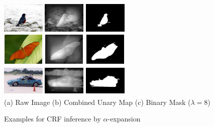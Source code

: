 \documentclass[10pt,twocolumn,letterpaper]{article}
\begin{document}
\begin{figure}[h]
\begin{center}
    \includegraphics[width=0.8in,height=0.6in]{./Figures/CRFinference/5_159_159364.jpg}
    \includegraphics[width=0.8in,height=0.6in]{./Figures/CRFinference/5_159_159364_3.jpg}
    \includegraphics[width=0.8in,height=0.6in]{./Figures/CRFinference/5_159_159364_2.jpg} \\
    \includegraphics[width=0.8in,height=0.6in]{./Figures/CRFinference/5_159_159649.jpg}
    \includegraphics[width=0.8in,height=0.6in]{./Figures/CRFinference/5_159_159649_3.jpg}
    \includegraphics[width=0.8in,height=0.6in]{./Figures/CRFinference/5_159_159649_2.jpg} \\
    \includegraphics[width=0.8in,height=0.6in]{./Figures/CRFinference/5_162_162349.jpg}
    \includegraphics[width=0.8in,height=0.6in]{./Figures/CRFinference/5_162_162349_3.jpg}
    \includegraphics[width=0.8in,height=0.6in]{./Figures/CRFinference/5_162_162349_2.jpg} \\
    \footnotesize  (a) Raw Image (b) Combined Unary Map  (c) Binary Mask ($\lambda=8$)\\
     \caption{Examples for CRF inference by $\alpha$-expansion}
\end{center}
\end{figure}
\end{document}
